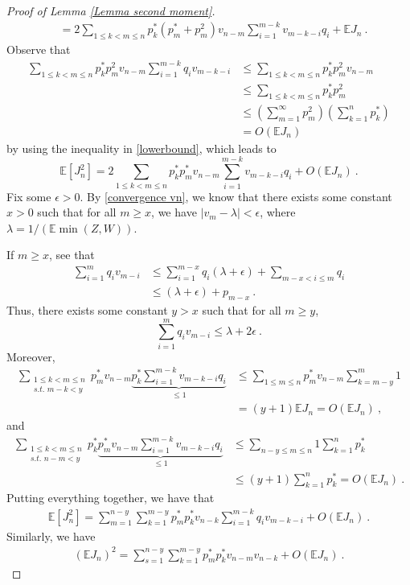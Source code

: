 \documentclass[10pt,a4paper]{amsart}
\newcommand{\E}{\mathbb{E}}
\begin{document}
\begin{proof}[Proof of Lemma \ref{Lemma second moment}]
\begin{align}
    &= 2\sum_{1\le k < m \le n} p_k^* (p_m^*+p_m^2)v_{n-m}\sum_{i=1}^{m-k}v_{m-k - i}q_i+ \E J_n ~.
\end{align}
Observe that
\begin{align}
    \sum_{1 \le k < m \le n}p_k^*p_m^2v_{n-m}\sum_{i=1}^{m-k}q_iv_{m-k-i} &\le \sum_{1 \le k < m \le n}p_k^*p_m^2v_{n-m} \nonumber \\
    &\le  \sum_{1 \le k < m \le n}p_k^*p_m^2 \nonumber \\
    &\le \left( \sum_{m=1}^\infty p_m ^2\right) \left(\sum_{k=1}^n p_k^*\right) \nonumber \\
    &=  O\left( \E J_n\right) \nonumber
\end{align}     
by using the inequality in \eqref{lowerbound}, which leads to 
\begin{equation}
    \E[J_n^2] = 2\sum_{1\le k < m \le n} p_k^*p_m^*v_{n-m}\sum_{i=1}^{m-k}v_{m-k-i}q_i+ O\left( \E J_n \right)~.
\end{equation}
Fix some $\epsilon >0$. By \eqref{convergence vn}, we know that there exists some constant $x>0$ such that for all $m \ge x$, we have $|v_m-\lambda|<\epsilon$,  where $\lambda = 1/(\E\min(Z,W))$.

\noindent If $m\ge x$, see that
\begin{align*}
    \sum_{i=1}^m q_i v_{m-i} &\le \sum_{i=1}^{m-x} q_i (\lambda + \epsilon) + \sum_{m-x<i\le m} q_i \\
    &\le (\lambda + \epsilon) + p_{m-x}~.
\end{align*} 
Thus, there exists some constant $y>x$ such that for all $m \ge y$,
$$ \sum_{i=1}^m q_i v_{m-i}\le \lambda + 2 \epsilon~.$$
Moreover,
\begin{align*}
    \sum_{\substack{1\le k < m \le n \\ \textit{s.t. } m-k < y} }p_m^*v_{n-m}\underbrace{p_k^*\sum_{i=1}^{m-k}v_{m-k-i}q_i}_{\le 1}  
    &\le \sum_{1\le m \le n}p_m^* v_{n-m} \sum_{k=m-y}^m 1 \\
    &= (y+1) \E J_n = O\left( \E J_n\right)~,
\end{align*}
and 
\begin{align*}
    \sum_{\substack{1\le k < m \le n \\ \textit{s.t. } n-m < y} }p_k^*\underbrace{p_m^*v_{n-m}\sum_{i=1}^{m-k}v_{m-k-i}q_i}_{\le 1} &\le \sum_{n-y\le m \le n}1 \sum_{k=1}^n p_k^* \\
    &\le (y+1) \sum_{k=1}^n p_k^*
    = O\left( \E J_n\right)~.
\end{align*}
Putting everything together, we have that 
\begin{align}
    \E [J_n^2] = \sum_{m=1}^{n-y}\sum_{k=1}^{m-y} p_m^*p_k^*v_{n-k}\sum_{i=1}^{m-k} q_i v_{m-k-i} + O\left( \E J_n\right)~. \label{equivalent 1}
\end{align}
Similarly, we have
\begin{align}
    (\E J_n)^2 = \sum_{s=1}^{n-y}\sum_{k=1}^{m-y} p_m^*p_k^*v_{n-m}v_{n-k} + O\left( \E J_n\right)~. \label{equivalent 2}
\end{align}


\end{proof}
\end{document}
